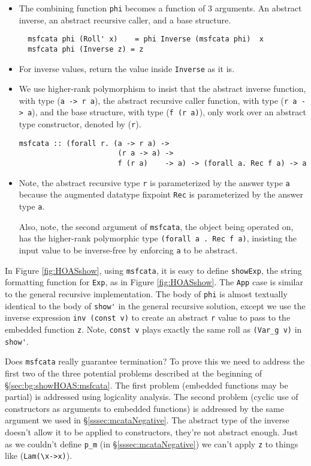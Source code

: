 \begin{itemize}
  \item The combining function \verb|phi| becomes a function of 3 arguments.
        An abstract inverse, an 
        abstract recursive caller, and a base structure.
\begin{verbatim}
  msfcata phi (Roll' x)    = phi Inverse (msfcata phi)  x
  msfcata phi (Inverse z) = z
\end{verbatim}
  \item For inverse values, return the value inside \verb|Inverse| as it is.

  \item We use higher-rank polymorphism to insist that 
        the abstract inverse function, with type (\verb|a -> r a|),
        the abstract recursive caller function, with type (\verb|r a -> a|), and
        the base structure, with type (\verb|f (r a)|), only work
        over an abstract type constructor, denoted by (\verb|r|).
\begin{verbatim}
msfcata :: (forall r. (a -> r a) ->
                       (r a -> a) ->
                       f (r a)    -> a) -> (forall a. Rec f a) -> a
\end{verbatim}
  \item Note, the abstract recursive type \verb|r| is parameterized by
        the answer type \verb|a| because the augmented datatype fixpoint \verb|Rec|
        is parameterized by the answer type \verb|a|.

        Also, note, the second argument of \verb|msfcata|, the object being
        operated on, has the higher-rank polymorphic type
        \verb|(forall a . Rec f a)|, insisting the input value to be inverse-free
        by enforcing \verb|a| to be abstract.
\end{itemize}

In Figure \ref{fig:HOASshow}, using \verb|msfcata|, it is easy to define \verb|showExp|,
the string formatting function for \verb|Exp|, as in Figure \ref{fig:HOASshow}.
The \verb|App| case is similar to the general recursive implementation.
The body of \verb|phi| is almost textually identical to the body of \verb|show'|
in the general recursive solution, except we use the inverse expression
\verb|inv (const v)| to create an abstract \verb|r| value to pass to
the embedded function \verb|z|.  Note, \verb|const v| plays exactly
the same roll as \verb|(Var_g v)| in \verb|show'|.

Does \verb|msfcata| really guarantee termination?  To prove this we need to
address the first two of the three potential problems described at
the beginning of \S\ref{sec:bg:showHOAS:msfcata}.  The first problem
(embedded functions may be partial) is addressed using logicality analysis.
The second problem (cyclic use of constructors as arguments to
embedded functions) is addressed by the same argument we used
in \S\ref{sssec:mcataNegative}.  The abstract type of the inverse
doesn't allow it to be applied to constructors, they're not abstract enough. 
Just as we couldn't define \verb|p_m| (in \S\ref{sssec:mcataNegative})
we can't apply \verb|z| to things like {\small (\verb|Lam(\x->x)|)}.

